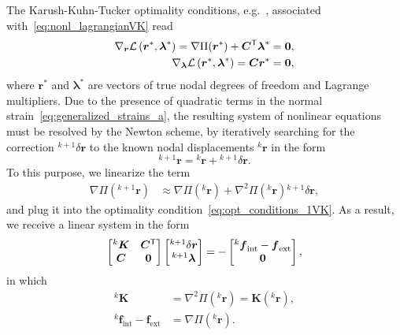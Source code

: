 \documentclass[11pt]{article}
\newcommand{\Etot}{\Pi}
\newcommand{\M}[1]{{\boldsymbol #1}}
\newcommand{\Mfint}{\M{f}_\mathrm{int}}
\newcommand{\Mfext}{\M{f}_{\mathrm{ext}}}
\newcommand{\ite}[1]{{^{#1}}}
\newcommand{\Md}{\M{r}}
\newcommand{\MKt}{\M{K}}\newcommand{\Eref}[1]{Eq.~\eqref{#1}}
\newcommand{\step}{k}\clearpage{}
\begin{document}
The Karush-Kuhn-Tucker optimality conditions, e.g.~\cite[Chapter~14]{Bonnans:2003:NOTPA}, associated with~\eqref{eq:nonl_lagrangianVK} read
\begin{subequations}\label{eq:opt_conditionsVK}
\begin{align}
\nabla_{\Md} 
\mathcal{L}\left( 
 \Md^*, \M{\lambda}^* 
\right)
=  
\nabla \Etot( \Md^* )
+ 
\M{C}\trn 	
\M{\lambda}^*
& =  
\M{0},
\label{eq:opt_conditions_1VK}
\\
\nabla_{\M{\lambda}} 
\mathcal{L}\left( 
 \Md^*, \M{\lambda}^* 
\right)
=
\M{C}\Md^*
& =  
\M{0},
\label{eq:opt_conditions_2VK}
\end{align} 
\end{subequations}
where $\Md^*$ and $\M{\lambda}^* $ are vectors of true nodal degrees of freedom and Lagrange multipliers. 
Due to the presence of quadratic terms in the normal strain~\eqref{eq:generalized_strains_a}, the
resulting system of nonlinear equations must be resolved by the Newton scheme, by
iteratively searching for the correction $\ite{\step+1}\delta\Md$ to the known
nodal displacements $\ite{\step}\Md$ in the form
\begin{equation}\label{eq:r_deltarVK}
\ite{\step+1}\Md
=
\ite{\step}\Md
+
\ite{\step+1}\delta\Md.
\end{equation}
To this purpose, we linearize the term
\begin{align}
\nabla\Etot( \ite{\step+1}\Md ) 
& \approx 
\nabla\Etot( \ite{\step}\Md )
+
\nabla^2 \Etot( \ite{\step}\Md)
\ite{\step+1}\delta\Md,
\end{align}
and plug it into the optimality condition~\eqref{eq:opt_conditions_1VK}. As a
result, we receive a linear system in the form
\begin{equation}\label{eq:systemVK}
\begin{bmatrix}
 \ite{\step}\M{K} & \M{C}\trn \\
 \M{C} & \M{0}
\end{bmatrix}
\begin{bmatrix}
 \ite{\step+1} \delta \Md \\
 \ite{\step+1} \M{\lambda}
\end{bmatrix}
=
-
\begin{bmatrix}
 \ite{\step}\Mfint - \Mfext \\
 \M{0}
\end{bmatrix}
,
\end{equation}
in which 
\begin{subequations}
\begin{align}
\ite{\step}\M{K} 
& =  
\nabla^2 \Etot( \ite{\step}\Md )
=
\MKt( \ite{\step}\Md ),
\\
\ite{\step}\Mfint - \Mfext
& =  
\nabla \Etot( \ite{\step}\Md ).
\end{align}
\end{subequations}
\end{document}
